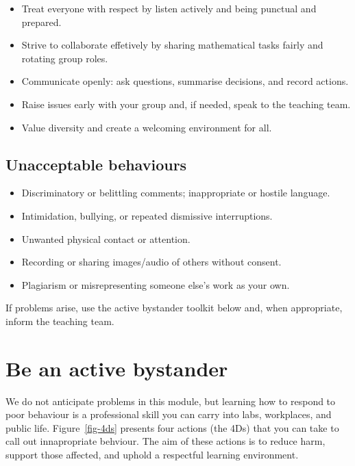 \documentclass[
  a4paper,
  DIV=11,
  numbers=noendperiod,
  oneside]{scrreprt}
\providecommand{\tightlist}{%
  \setlength{\itemsep}{0pt}\setlength{\parskip}{0pt}}
\begin{document}
\begin{itemize}
\tightlist
\item
  Treat everyone with respect by listen actively and being punctual and
  prepared.
\item
  Strive to collaborate effetively by sharing mathematical tasks fairly
  and rotating group roles.
\item
  Communicate openly: ask questions, summarise decisions, and record
  actions.
\item
  Raise issues early with your group and, if needed, speak to the
  teaching team.
\item
  Value diversity and create a welcoming environment for all.
\end{itemize}

\subsection{Unacceptable behaviours}\label{unacceptable-behaviours}

\begin{itemize}
\tightlist
\item
  Discriminatory or belittling comments; inappropriate or hostile
  language.
\item
  Intimidation, bullying, or repeated dismissive interruptions.
\item
  Unwanted physical contact or attention.
\item
  Recording or sharing images/audio of others without consent.
\item
  Plagiarism or misrepresenting someone else's work as your own.
\end{itemize}

If problems arise, use the active bystander toolkit below and, when
appropriate, inform the teaching team.

\section{Be an active bystander}\label{be-an-active-bystander}

We do not anticipate problems in this module, but learning how to
respond to poor behaviour is a professional skill you can carry into
labs, workplaces, and public life. Figure~\ref{fig-4ds} presents four
actions (the 4Ds) that you can take to call out innapropriate behviour.
The aim of these actions is to reduce harm, support those affected, and
uphold a respectful learning environment.
\end{document}
